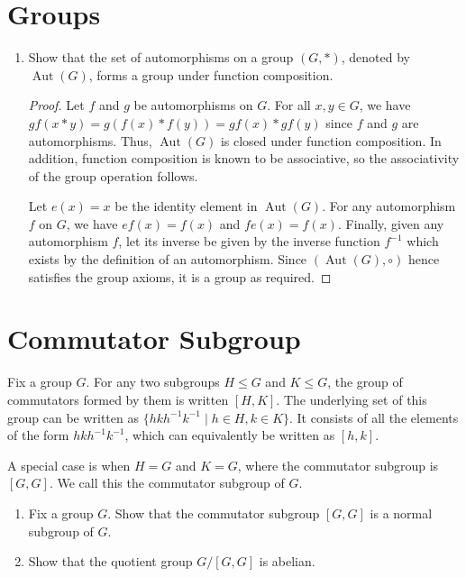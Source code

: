 \documentclass[12pt]{article}
\begin{document}
\section{Groups}

\begin{enumerate}
  \item Show that the set of automorphisms on a group \((G, *)\), denoted by
    \(\operatorname{Aut}(G)\), forms a group under function composition.

  \begin{proof}
    Let \(f\) and \(g\) be automorphisms on \(G\). For all \(x, y \in G\), we
    have \(gf(x * y) = g(f(x) * f(y)) = gf(x) * gf(y)\) since \(f\) and \(g\)
    are automorphisms. Thus, \(\operatorname{Aut}(G)\) is closed under function
    composition. In addition, function composition is known to be associative,
    so the associativity of the group operation follows.

    Let \(e(x) = x\) be the identity element in \(\operatorname{Aut}(G)\). For
    any automorphism \(f\) on \(G\), we have \(ef(x) = f(x)\) and \(fe(x) =
    f(x)\). Finally, given any automorphism \(f\), let its inverse be given by
    the inverse function \(f^{-1}\) which exists by the definition of an
    automorphism. Since \((\operatorname{Aut}(G), \circ)\) hence satisfies the
    group axioms, it is a group as required.
  \end{proof}
\end{enumerate}

\section{Commutator Subgroup}

Fix a group \(G\). For any two subgroups \(H \leq G\) and \(K \leq G\), the
group of commutators formed by them is written \([H, K]\). The underlying set
of this group can be written as \(\{hkh^{-1}k^{-1} \mid h \in H, k \in K\}\).
It consists of all the elements of the form \(hkh^{-1}k^{-1}\), which can
equivalently be written as \([h, k]\).

A special case is when \(H = G\) and \(K = G\), where the commutator subgroup
is \([G, G]\). We call this the commutator subgroup of \(G\).

\begin{enumerate}
  \item Fix a group \(G\). Show that the commutator subgroup \([G, G]\) is a
    normal subgroup of \(G\).
  \item Show that the quotient group \(G/[G, G]\) is abelian.
\end{enumerate}
\end{document}
